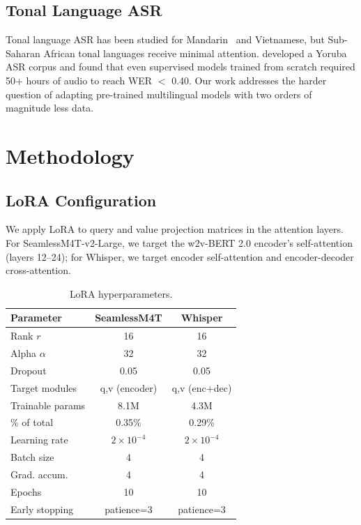 \documentclass[11pt,a4paper]{article}
\newcommand{\modelSM}{SeamlessM4T-v2-Large}
\begin{document}
\subsection{Tonal Language ASR}
Tonal language ASR has been studied for Mandarin~\citep{li2019tonal} and Vietnamese, but Sub-Saharan African tonal languages receive minimal attention. \citet{meyer2022african} developed a Yoruba ASR corpus and found that even supervised models trained from scratch required 50+ hours of audio to reach WER $<$ 0.40. Our work addresses the harder question of adapting pre-trained multilingual models with two orders of magnitude less data.

\section{Methodology}
\label{sec:method}

\subsection{LoRA Configuration}
We apply LoRA to query and value projection matrices in the attention layers. For \modelSM{}, we target the w2v-BERT 2.0 encoder's self-attention (layers 12–24); for Whisper, we target encoder self-attention and encoder-decoder cross-attention.

\begin{table}[t]
\centering
\small
\caption{LoRA hyperparameters.}
\label{tab:lora_config}
\begin{tabular}{lcc}
\toprule
\textbf{Parameter} & \textbf{SeamlessM4T} & \textbf{Whisper} \\
\midrule
Rank $r$ & 16 & 16 \\
Alpha $\alpha$ & 32 & 32 \\
Dropout & 0.05 & 0.05 \\
Target modules & q,v (encoder) & q,v (enc+dec) \\
Trainable params & 8.1M & 4.3M \\
\% of total & 0.35\% & 0.29\% \\
\midrule
Learning rate & $2\times10^{-4}$ & $2\times10^{-4}$ \\
Batch size & 4 & 4 \\
Grad. accum. & 4 & 4 \\
Epochs & 10 & 10 \\
Early stopping & patience=3 & patience=3 \\
\bottomrule
\end{tabular}
\end{table}
\end{document}
